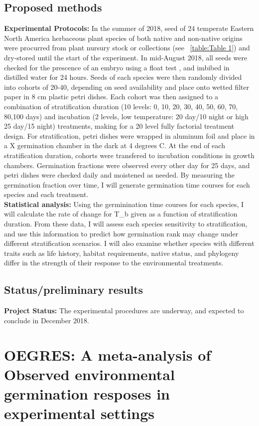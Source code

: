 \documentclass{article}\usepackage[]{graphicx}\usepackage[]{color}
\begin{document}
\subsection*{Proposed methods}
\textbf{Experimental Protocols:} In the summer of 2018, seed of 24 temperate Eastern North America herbaceous plant species of both native and non-native origins were procurred from plant nursury stock or collections (see ~\ref{table:Table 1}) and dry-stored until the start of the experiment. In mid-August 2018, all seeds were checked for the prescence of an embryo using a float test \citep{Baskin2014}, and imbibed in distilled water for 24 hours. Seeds of each species were then randomly divided into cohorts of 20-40, depending on seed availability and place onto wetted filter paper in 8 cm plastic petri dishes. Each cohort was then assigned to a combination of stratification duration (10 levels: 0, 10, 20, 30, 40, 50, 60, 70, 80,100 days) and incubation (2 levels, low temperature: 20 day/10 night or high 25 day/15 night) treatments, making for a 20 level fully factorial treatment design. For stratification, petri dishes were wrapped in aluminum foil and place in a X germination chamber in the dark at 4 degrees C. At the end of each stratification duration, cohorts were transfered to incubation conditions in growth chambers. Germination fractions were observed every other day for 25 days, and petri dishes were checked daily and moistened as needed. By measuring the germination fraction over time, I will generate germination time courses for each species and each treatment.\\
\textbf{Statistical analysis:} Using the germinination time courses for each species, I will calculate the rate of change for T_b given as a function of stratification duration. From these data, I will assess each species sensitivity to stratification, and use this information to predict how germination rank may change under different stratification scenarios. I will also examine whether species with different traits such as life history, habitat requirements, native status, and phylogeny differ in the strength of their response to the environmental treatments.\\
\subsection{Status/preliminary results}
\textbf{Project Status:} The experimental procedures are underway, and expected to conclude in December 2018.\\
\section*{OEGRES: A meta-analysis of Observed environmental germination resposes in experimental settings}
\end{document}
